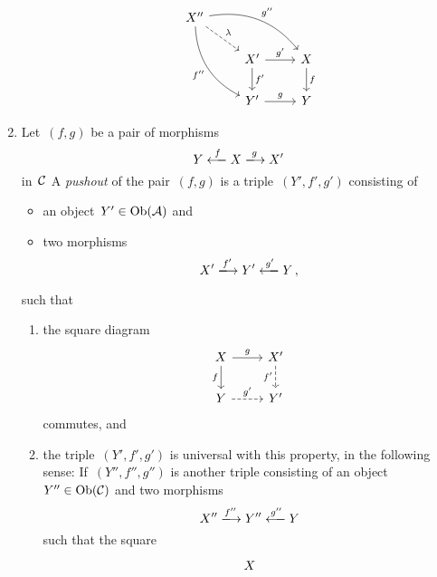 \begin{definition*}
\begin{enumerate}
\begin{enumerate}[label=(PB\arabic*)]
\[            \begin{tikzcd}
                X''
                \arrow[bend left]{drr}[above right]{g''}
                \arrow[dashed]{dr}[above right]{\lambda}
                \arrow[bend right]{ddr}[below left]{f''}
              & {}
              & {}
              \\
                {}
              & X'
                \arrow{r}[above]{g'}
                \arrow{d}[right]{f'}
              & X
                \arrow{d}[right]{f}
              \\
                {}
              & Y'
                \arrow{r}[above]{g}
              & Y
            \end{tikzcd}
          \]
      \end{enumerate}
      
    \item
      Let~$(f,g)$ be a pair of morphisms
      \[
        Y \xlongfrom{f} X \xlongto{g} X'
      \]
      in~$\mathcal{C}$
      A \emph{pushout} of the pair~$(f,g)$ is a triple~$(Y',f',g')$ consisting of
      \begin{itemize}
        \item
          an object~$Y' \in \operatorname{Ob}(\mathcal{A})$ and
        \item
          two morphisms
          \[
            X' \xlongto{f'} Y' \xlongfrom{g'} Y \,,
          \]
      \end{itemize}
      such that
      \begin{enumerate}[label=(PO\arabic*)]
        \item
          the square diagram
          \[
            \begin{tikzcd}
                X
                \arrow{r}[above]{g}
                \arrow{d}[left]{f}
              & X'
                \arrow[dashed]{d}[left]{f'}
              \\
                Y
                \arrow[dashed]{r}[above]{g'}
              & Y'
            \end{tikzcd}
          \]
          commutes, and
        \item
          the triple~$(Y',f',g')$ is universal with this property, in the following sense:
          If~$(Y'', f'', g'')$ is another triple consisting of an object~$Y'' \in \operatorname{Ob}(\mathcal{C})$ and two morphisms
          \[
            X'' \xlongto{f''} Y'' \xlongfrom{g''} Y
          \]
          such that the square
          \[
            \begin{tikzcd}
                X

\end{tikzcd}\]
\end{enumerate}
\end{enumerate}
\end{definition*}
